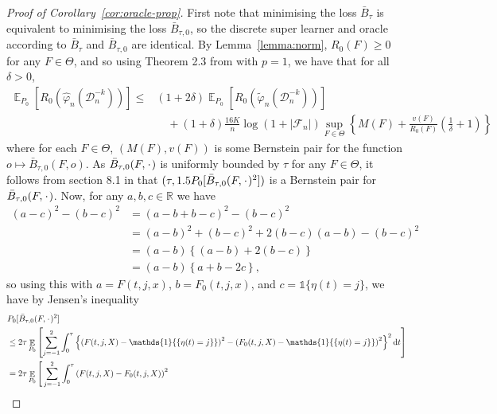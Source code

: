 \documentclass[unnumsec,webpdf,contemporary,large,namedate]{oup-authoring-template}%
\theoremstyle{thmstyleone}%
\theoremstyle{thmstyletwo}%
\theoremstyle{thmstylethree}%
\DeclareMathOperator{\E}{\mathbb{E}} %
\newcommand{\R}{\mathbb{R}}
\newcommand{\blank}{\makebox[1ex]{\textbf{$\cdot$}}}
\renewcommand{\phi}{\varphi}
\newcommand*\diff{\mathop{}\!\mathrm{d}}
\newcommand{\1}{\mathds{1}}
\newcommand{\data}{\ensuremath{\mathcal{D}}}
\begin{document}
\begin{appendices}
\begin{proof}[Proof of Corollary~\ref{cor:oracle-prop}]
  First note that minimising the loss \( \bar{B}_{\tau} \) is equivalent to
  minimising the loss \( \bar{B}_{\tau,0} \), so the discrete super learner and
  oracle according to \( \bar{B}_{\tau} \) and \( \bar{B}_{\tau,0} \) are
  identical. By Lemma~\ref{lemma:norm}, \( R_0(F) \geq 0 \) for any
  \( F \in \Theta \), and so using Theorem 2.3 from \citep{vaart2006oracle} with
  \( p=1 \), we have that for all \( \delta >0 \),
\begin{align*}
  \E_{P_0}{\left[ R_0(\hat{\phi}_n(\data_n^{-k})) \right]}
  \leq
  &(1+2\delta)\E_{P_0}{\left[ R_0(\tilde{\phi}_n(\data_n^{-k})) \right]}
  \\
  & \quad + (1+\delta) \frac{16 K}{n}
    \log(1 + |\mathcal{F}_n|)\sup_{F \in \Theta}
    \left\{
    M(F) + \frac{v(F)}{R_0(F)}
    \left(
    \frac{1}{\delta} + 1
    \right)
    \right\}
\end{align*}
where for each \( F \in \Theta \), \( (M(F), v(F)) \) is some Bernstein pair for
the function \(o \mapsto \bar{B}_{\tau,0}(F, o) \). As
\( \bar{B}_{\tau,0}(F, \blank) \) is uniformly bounded by \( \tau \) for any
\( F \in \Theta \), it follows from section 8.1 in \citep{vaart2006oracle} that
\( (\tau, 1.5 P_0{[\bar{B}_{\tau,0}(F, \blank)^2]}) \) is a Bernstein pair for
\( \bar{B}_{\tau,0}(F, \blank) \). Now, for any \( a,b,c \in \R \) we have
\begin{align*}
  (a-c)^2 - (b-c)^2
  & = (a-b+b-c)^2 - (b-c)^2
  \\
  & = (a-b)^2 + (b-c)^2 +2(b-c)(a-b) - (b-c)^2
  \\
  & = (a-b)
    \left\{
    (a-b) +  2(b-c)
    \right\}
  \\
  & = (a-b)
    \left\{
     a + b -2c
    \right\},
\end{align*}
so using this with \( a=F(t, j, x) \), \( b=F_0(t, j, x) \), and
\( c = \1{\{\eta(t) = j\}} \), we have by Jensen's inequality
\begin{align*}
  & P_0{[\bar{B}_{\tau,0}(F, \blank)^2]}
  \\
  & \leq
    2\tau\E_{P_0}{\left[
    \sum_{j=-1}^{2} \int_0^{\tau}
    \left\{
    \left(
    F(t, j, X) - \1{\{\eta(t) = j\}}
    \right)^2
    -
    \left(
    F_0(t, j, X) - \1{\{\eta(t) = j\}}
    \right)^2
    \right\}^2
    \diff t 
    \right]}
  \\
  & =2\tau
    \E_{P_0}\Bigg[
    \sum_{j=-1}^{2} \int_0^{\tau}
    \left(
    F(t, j, X) - F_0(t, j, X)
    \right)^2
  \\

\end{align*}
\end{proof}
\end{appendices}
\end{document}
